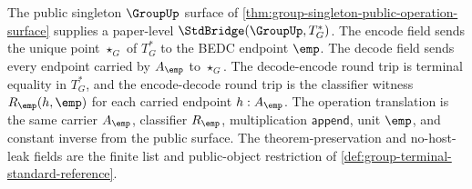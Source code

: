 \begin{theorem}
\label{thm:group-singleton-terminal-standard-bridge}
The public singleton $\GroupUp$ surface of
\autoref{thm:group-singleton-public-operation-surface} supplies a paper-level
$\StdBridge(\GroupUp,T_G^\ast)$. The encode field sends the unique point
$\star_G$ of $T_G^\ast$ to the BEDC endpoint $\emp$. The decode field sends
every endpoint carried by $A_{\emp}$ to $\star_G$. The decode-encode round trip
is terminal equality in $T_G^\ast$, and the encode-decode round trip is the
classifier witness $R_{\emp}(h,\emp)$ for each carried endpoint $h:A_{\emp}$.
The operation translation is the same carrier $A_{\emp}$, classifier
$R_{\emp}$, multiplication $\mathsf{append}$, unit $\emp$, and constant inverse
from the public surface. The theorem-preservation and no-host-leak fields are
the finite list and public-object restriction of
\autoref{def:group-terminal-standard-reference}.
\end{theorem}
